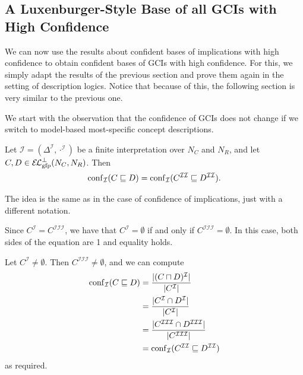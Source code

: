 \subsection{A Luxenburger-Style Base of all GCIs with High Confidence}
\label{sec:first-base}

We can now use the results about confident bases of implications with high confidence to
obtain confident bases of GCIs with high confidence.  For this, we simply adapt the
results of the previous section and prove them again in the setting of description logics.
Notice that because of this, the following section is very similar to the previous one.

We start with the observation that the confidence of GCIs does not change if we switch to
model-based most-specific concept descriptions.

\begin{Lemma}
  \label{lem:confidence-stays-under-mmsc}
  Let $\mathcal{I} = (\Delta^{\mathcal{I}}, \cdot^{\mathcal{I}})$ be a finite
  interpretation over $N_C$ and $N_R$, and let $C, D \in \ELgfpbot(N_C, N_R)$.  Then
  \begin{equation*}
    \operatorname{conf}_{\mathcal{I}}( C \sqsubseteq D ) = \operatorname{conf}_{\mathcal{I}}(
    C^{\mathcal{I}\mathcal{I}} \sqsubseteq D^{\mathcal{I}\mathcal{I}}).
  \end{equation*}
\end{Lemma}
\begin{Proof}
  The idea is the same as in the case of confidence of implications, just with a different
  notation.

  Since $C^{\mathcal{I}} = C^{\mathcal{I}\mathcal{I}\mathcal{I}}$, we have that
  $C^{\mathcal{I}} = \emptyset$ if and only if $C^{\mathcal{I}\mathcal{I}\mathcal{I}} =
  \emptyset$.  In this case, both sides of the equation are 1 and equality holds.

  Let $C^{\mathcal{I}} \neq \emptyset$.  Then $C^{\mathcal{I}\mathcal{I}\mathcal{I}} \neq
  \emptyset$, and we can compute
  \begin{align*}
    \operatorname{conf}_{\mathcal{I}}( C \sqsubseteq D )
    &= \frac{ \lvert (C \sqcap D)^{\mathcal{I}} \rvert }{ \lvert C^{\mathcal{I}} \rvert } \\
    &= \frac{ \lvert C^{\mathcal{I}} \cap D^{\mathcal{I}} \rvert }{ \lvert C^{\mathcal{I}} \rvert }
    \\
    &= \frac{ \lvert C^{\mathcal{I}\mathcal{I}\mathcal{I}} \cap
        D^{\mathcal{I}\mathcal{I}\mathcal{I}} \rvert }{ \lvert
        C^{\mathcal{I}\mathcal{I}\mathcal{I}} \rvert } \\
    &= \operatorname{conf}_{\mathcal{I}}( C^{\mathcal{I}\mathcal{I}} \sqsubseteq
    D^{\mathcal{I}\mathcal{I}} )
  \end{align*}
  as required.
\end{Proof}

